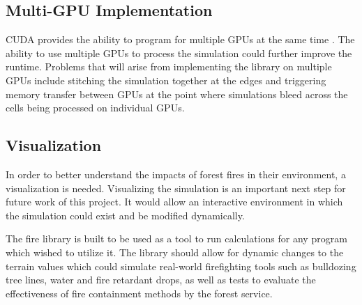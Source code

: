 \subsection{Multi-GPU Implementation} 
CUDA provides the ability to program for multiple GPUs at the same time \cite{cuda}. The ability to use multiple GPUs to process the simulation could further improve the runtime. Problems that will arise from implementing the library on multiple GPUs include stitching the simulation together at the edges and triggering memory transfer between GPUs at the point where simulations bleed across the cells being processed on individual GPUs. 

\subsection{Visualization}
In order to better understand the impacts of forest fires in their environment, a visualization is needed. Visualizing the simulation is an important next step for future work of this project. It would allow an interactive environment in which the simulation could exist and be modified dynamically. 

The fire library is built to be used as a tool to run calculations for any program which wished to utilize it. The library should allow for dynamic changes to the terrain values which could simulate real-world firefighting tools such as bulldozing tree lines, water and fire retardant drops, as well as tests to evaluate the effectiveness of fire containment methods by the forest service. 